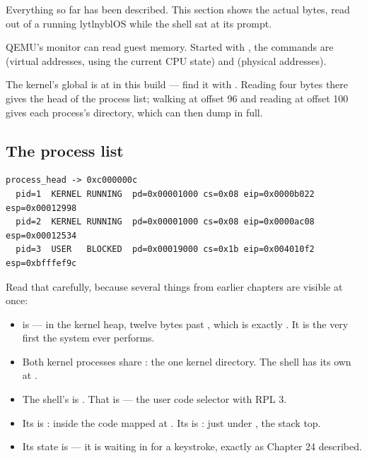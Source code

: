Everything so far has been described. This section shows the actual bytes, read out of a running
lytlnyblOS while the shell sat at its prompt.

\begin{tryit}
QEMU's monitor can read guest memory. Started with
, the commands are  (virtual addresses,
using the current CPU state) and  (physical addresses).

The kernel's  global is at  in this build --- find it with
. Reading four bytes there gives the head of the process list;
walking  at offset 96 and reading  at offset 100 gives each process's
directory, which  can then dump in full.
\end{tryit}

\subsection{The process list}

\begin{lstlisting}[style=txt]
process_head -> 0xc000000c
  pid=1  KERNEL RUNNING  pd=0x00001000 cs=0x08 eip=0x0000b022 esp=0x00012998
  pid=2  KERNEL RUNNING  pd=0x00001000 cs=0x08 eip=0x0000ac08 esp=0x00012534
  pid=3  USER   BLOCKED  pd=0x00019000 cs=0x1b eip=0x004010f2 esp=0xbfffef9c
\end{lstlisting}

Read that carefully, because several things from earlier chapters are visible at once:

\begin{itemize}
  \item {} is  --- in the kernel heap, twelve bytes past
        , which is exactly . It is the very first
         the system ever performs.
  \item Both kernel processes share : the one kernel directory. The shell has its
        own at .
  \item The shell's  is . That is  --- the user code selector
        with RPL 3. 
  \item Its  is : inside the code mapped at . Its  is
        : just under , the stack top.
  \item Its state is  --- it is waiting in  for a keystroke, exactly as
        Chapter 24 described.
\end{itemize}

